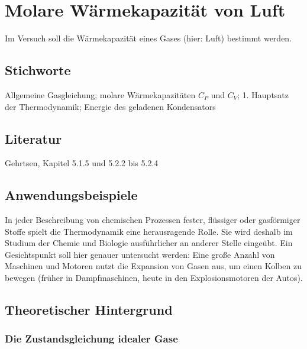 \chapter{Molare Wärmekapazität von Luft}
\label{v:6}

Im Versuch soll die Wärmekapazität eines Gases (hier: Luft) bestimmt werden.

\section{Stichworte}

Allgemeine Gasgleichung; molare Wärmekapazitäten $C_P$ und $C_V$; 1. Hauptsatz der Thermodynamik; Energie des geladenen Kondensators
%
\section{Literatur}

Gehrtsen, Kapitel 5.1.5 und 5.2.2 bis 5.2.4
%
\section{Anwendungsbeispiele}
%
In jeder Beschreibung von chemischen Prozessen fester, flüssiger oder gasförmiger Stoffe spielt die Thermodynamik eine herausragende Rolle. Sie wird deshalb im Studium der Chemie und Biologie ausführlicher an anderer Stelle eingeübt. Ein Gesichtspunkt soll hier genauer untersucht werden: Eine große Anzahl von Maschinen und Motoren nutzt die Expansion von Gasen aus, um einen Kolben zu bewegen (früher in Dampfmaschinen, heute in den Explosionsmotoren der Autos).

%
\section{Theoretischer Hintergrund}

\subsection{Die Zustandsgleichung idealer Gase}

